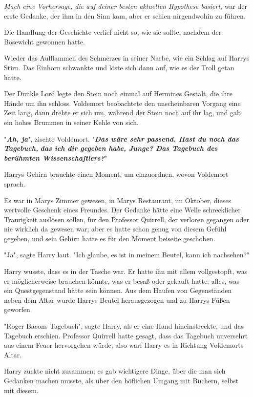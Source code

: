 {\emph{Mach eine Vorhersage, die auf deiner besten aktuellen Hypothese basiert}, war der erste Gedanke, der ihm in den Sinn kam, aber er schien nirgendwohin zu führen.

Die Handlung der Geschichte verlief nicht so, wie sie sollte, nachdem der Bösewicht gewonnen hatte.

Wieder das Aufflammen des Schmerzes in seiner Narbe, wie ein Schlag auf Harrys Stirn. Das Einhorn schwankte und löste sich dann auf, wie es der Troll getan hatte.

Der Dunkle Lord legte den Stein noch einmal auf Hermines Gestalt, die ihre Hände um ihn schloss. Voldemort beobachtete den unscheinbaren Vorgang eine Zeit lang, dann drehte er sich um, während der Stein noch auf ihr lag, und gab ein hohes Brummen in seiner Kehle von sich.

"\textbf{\emph{Ah, ja}}", zischte Voldemort. "\textbf{\emph{Das wäre sehr passend. Hast du noch das Tagebuch,}} \textbf{\emph{das ich dir gegeben habe, Junge? Das Tagebuch des berühmten Wissenschaftlers?}}"

Harrys Gehirn brauchte einen Moment, um einzuordnen, wovon Voldemort sprach.

Es war in Marys Zimmer gewesen, in Marys Restaurant, im Oktober, dieses wertvolle Geschenk eines Freundes. Der Gedanke hätte eine Welle schrecklicher Traurigkeit auslösen sollen, für den Professor Quirrell, der verloren gegangen oder nie wirklich da gewesen war; aber es hatte schon genug von diesem Gefühl gegeben, und sein Gehirn hatte es für den Moment beiseite geschoben.

"Ja", sagte Harry laut. "Ich glaube, es ist in meinem Beutel, kann ich nachsehen?"

Harry wusste, dass es in der Tasche war. Er hatte ihn mit allem vollgestopft, was er möglicherweise brauchen könnte, was er besaß oder gekauft hatte; alles, was ein Questgegenstand hätte sein können. Aus dem Haufen von Gegenständen neben dem Altar wurde Harrys Beutel herausgezogen und zu Harrys Füßen geworfen.

"Roger Bacons Tagebuch", sagte Harry, als er eine Hand hineinstreckte, und das Tagebuch erschien. Professor Quirrell hatte gesagt, dass das Tagebuch unversehrt aus einem Feuer hervorgehen würde, also warf Harry es in Richtung Voldemorts Altar.

Harry zuckte nicht zusammen; es gab wichtigere Dinge, über die man sich Gedanken machen musste, als über den höflichen Umgang mit Büchern, selbst mit diesem.

}
